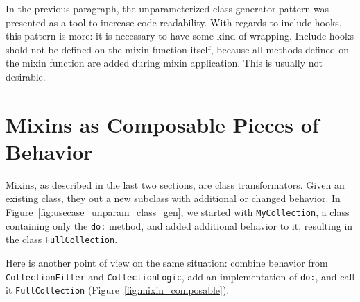 In the previous paragraph, the unparameterized class generator pattern was presented as a tool to increase code readability. With regards to include hooks, this pattern is more: it is necessary to have some kind of wrapping. Include hooks shold not be defined on the mixin function itself, because all methods defined on the mixin function are added during mixin application. This is usually not desirable.

\section{Mixins as Composable Pieces of Behavior}
Mixins, as described in the last two sections, are class transformators. Given an existing class, they out a new subclass with additional or changed behavior. In Figure~\ref{fig:usecase_unparam_class_gen}, we started with \texttt{MyCollection}, a class containing only the \texttt{do:} method, and added additional behavior to it, resulting in the class \texttt{FullCollection}. 

Here is another point of view on the same situation: combine behavior from \texttt{CollectionFilter} and \texttt{CollectionLogic}, add an implementation of \texttt{do:}, and call it \texttt{FullCollection} (Figure~\ref{fig:mixin_composable}).

